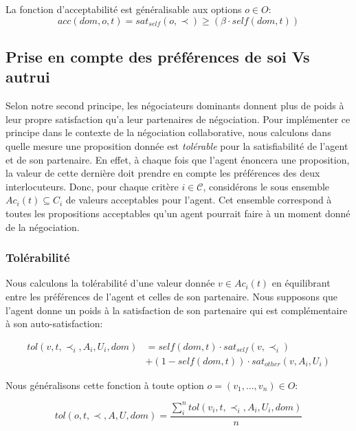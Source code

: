 	
	
	La fonction d'acceptabilité est généralisable aux options $o \in O$:
	 $$acc(dom,o, t) = sat_{self}(o, \prec) \geq  (\beta \cdot self(dom,t))$$

	
	\subsection {Prise en compte des préférences de soi Vs autrui}
	Selon notre second principe, les négociateurs dominants donnent plus de poids à leur propre satisfaction qu'a leur partenaires de négociation. 
	Pour implémenter ce principe dans le contexte de la négociation collaborative, nous calculons dans quelle mesure une proposition donnée est \emph{tolérable} pour la satisfiabilité de l'agent et de son partenaire.
	En effet, à chaque fois que l'agent énoncera une proposition, la valeur de cette dernière doit prendre en compte les préférences des deux interlocuteurs. 
	Donc, pour chaque critère $i\in \mathcal{C}$, considérons le sous ensemble $Ac_i(t)\subseteq C_i$ de valeurs acceptables pour l'agent.
	Cet ensemble correspond à toutes les propositions acceptables qu'un agent pourrait faire à un moment donné de la négociation.
	
	\subsubsection{Tolérabilité}
	Nous calculons la tolérabilité d'une valeur donnée $ v \in Ac_i(t) $ en équilibrant entre les préférences de l'agent et celles de son partenaire. Nous supposons que l'agent donne un poids à la satisfaction de son partenaire qui est complémentaire à son auto-satisfaction:
	
	\begin{equation}
	\begin{split}
	tol(v, t, \prec_i, A_i, U_i, dom) & = self(dom, t)  \cdot sat_{self}(v, \prec_i) \\
	& +  (1 - self(dom, t)) \cdot sat_{other}(v, A_i, U_i)
	\end{split} 
	\end{equation}
	

	Nous généralisons cette fonction à toute option 
	$o = (v_1,\ldots,v_n) \in O$:
	
	\begin{equation}
	tol(o, t, \prec, A, U, dom) = \frac{ \sum_{i}^{n} tol(v_i, t, \prec_i, A_i, U_i, dom) } {n}
	\end{equation}
	
